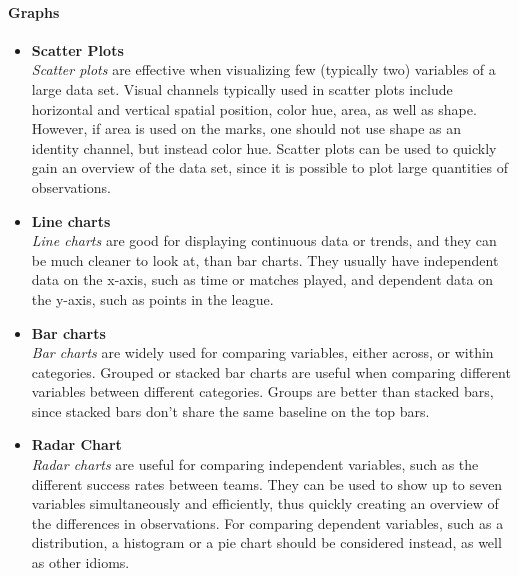 \documentclass[Report.tex]{subfiles}
\begin{document}
\paragraph{Graphs\\}
\begin{itemize}
  \item \textbf{Scatter Plots}
  \\\emph{Scatter plots} are effective when visualizing few (typically two) variables
  of a large data set\cite[Chapter 5, p. 54]{Iliinsky}. Visual channels typically used in
  scatter plots include horizontal and vertical spatial position, color hue, area, as well as shape. However,
  if area is used on the marks, one should not use shape as an identity channel,
  but instead color hue. 
  Scatter plots can be used to quickly gain an overview of the data set, since
  it is possible to plot large quantities of observations.
  
  \item \textbf{Line charts}
  \\\emph{Line charts} are good for displaying continuous data or trends, and they can
  be much cleaner to look at, than bar charts. They usually have independent
  data on the x-axis, such as time or matches played, and dependent data on the
  y-axis, such as points in the league.
  
  \item \textbf{Bar charts}
  \\\emph{Bar charts} are widely used for comparing variables, either across, or within
  categories. Grouped or stacked bar charts are useful when comparing different variables between different categories.
 Groups are better than stacked bars, since stacked
  bars don't share the same baseline on the top bars.
  
  \item \textbf{Radar Chart}
  \\\emph{Radar charts} are useful for comparing independent variables, such as the
  different success rates between teams. They can be used to show up to seven
  variables simultaneously and efficiently, thus quickly creating an overview of the
  differences in observations. For comparing dependent variables, such as a
  distribution, a histogram or a pie chart should be considered instead, as well
  as other idioms.

\end{itemize}
\end{document}
